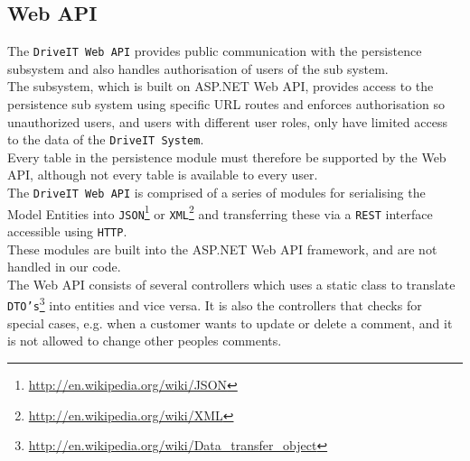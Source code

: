 \subsection{Web API} 
The \texttt{DriveIT Web API} provides public communication with the persistence subsystem and also handles authorisation of users of the sub system.\\
The subsystem, which is built on ASP.NET Web API, provides access to the persistence sub system using specific URL routes and enforces authorisation so unauthorized users, and users with different user roles, only have limited access to the data of the \texttt{DriveIT System}.\\ 
Every table in the persistence module must therefore be supported by the Web API, although not every table is available to every user.\\
The \texttt{DriveIT Web API} is comprised of a series of modules for serialising the Model Entities into \texttt{JSON}\footnote{\url{http://en.wikipedia.org/wiki/JSON}} or \texttt{XML}\footnote{\url{http://en.wikipedia.org/wiki/XML}} and transferring these via a \texttt{REST} interface accessible using \texttt{HTTP}. \\
These modules are built into the ASP.NET Web API framework, and are not handled in our code.\\

The Web API consists of several controllers which uses a static class to translate \texttt{DTO's}\footnote{\url{http://en.wikipedia.org/wiki/Data_transfer_object}} into entities and vice versa. It is also the controllers that checks for special cases, e.g. when a customer wants to update or delete a comment, and it is not allowed to change other peoples comments.


